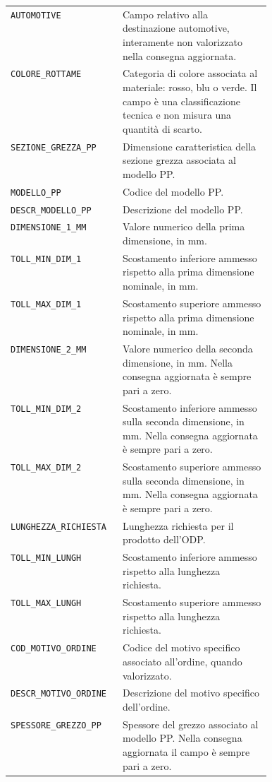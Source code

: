 \begin{longtable}{@{}p{0.43\linewidth}p{}@{}}
\texttt{AUTOMOTIVE} & Campo relativo alla destinazione automotive, interamente non valorizzato nella consegna aggiornata. \\
\texttt{COLORE\_ROTTAME} & Categoria di colore associata al materiale: rosso, blu o verde. Il campo è una classificazione tecnica e non misura una quantità di scarto. \\
\texttt{SEZIONE\_GREZZA\_PP} & Dimensione caratteristica della sezione grezza associata al modello PP. \\
\texttt{MODELLO\_PP} & Codice del modello PP. \\
\texttt{DESCR\_MODELLO\_PP} & Descrizione del modello PP. \\
\texttt{DIMENSIONE\_1\_MM} & Valore numerico della prima dimensione, in mm. \\
\texttt{TOLL\_MIN\_DIM\_1} & Scostamento inferiore ammesso rispetto alla prima dimensione nominale, in mm. \\
\texttt{TOLL\_MAX\_DIM\_1} & Scostamento superiore ammesso rispetto alla prima dimensione nominale, in mm. \\
\texttt{DIMENSIONE\_2\_MM} & Valore numerico della seconda dimensione, in mm. Nella consegna aggiornata è sempre pari a zero. \\
\texttt{TOLL\_MIN\_DIM\_2} & Scostamento inferiore ammesso sulla seconda dimensione, in mm. Nella consegna aggiornata è sempre pari a zero. \\
\texttt{TOLL\_MAX\_DIM\_2} & Scostamento superiore ammesso sulla seconda dimensione, in mm. Nella consegna aggiornata è sempre pari a zero. \\
\texttt{LUNGHEZZA\_RICHIESTA} & Lunghezza richiesta per il prodotto dell'ODP. \\
\texttt{TOLL\_MIN\_LUNGH} & Scostamento inferiore ammesso rispetto alla lunghezza richiesta. \\
\texttt{TOLL\_MAX\_LUNGH} & Scostamento superiore ammesso rispetto alla lunghezza richiesta. \\
\texttt{COD\_MOTIVO\_ORDINE} & Codice del motivo specifico associato all'ordine, quando valorizzato. \\
\texttt{DESCR\_MOTIVO\_ORDINE} & Descrizione del motivo specifico dell'ordine. \\
\texttt{SPESSORE\_GREZZO\_PP} & Spessore del grezzo associato al modello PP. Nella consegna aggiornata il campo è sempre pari a zero. \\
\end{longtable}
\endgroup


